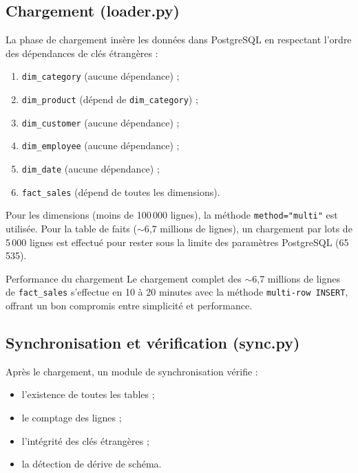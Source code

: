 \documentclass[12pt,a4paper,twoside]{report}
\begin{document}
\subsection{Chargement (loader.py)}

La phase de chargement insère les données dans PostgreSQL en respectant l'ordre des dépendances de clés étrangères :

\begin{enumerate}
  \item \texttt{dim\_category} (aucune dépendance) ;
  \item \texttt{dim\_product} (dépend de \texttt{dim\_category}) ;
  \item \texttt{dim\_customer} (aucune dépendance) ;
  \item \texttt{dim\_employee} (aucune dépendance) ;
  \item \texttt{dim\_date} (aucune dépendance) ;
  \item \texttt{fact\_sales} (dépend de toutes les dimensions).
\end{enumerate}

Pour les dimensions (moins de 100\,000 lignes), la méthode \texttt{method="multi"} est utilisée. Pour la table de faits ($\sim$6,7 millions de lignes), un chargement par lots de 5\,000 lignes est effectué pour rester sous la limite des paramètres PostgreSQL (65\,535).

\begin{resultbox}{Performance du chargement}
Le chargement complet des $\sim$6,7 millions de lignes de \texttt{fact\_sales} s'effectue en 10 à 20 minutes avec la méthode \texttt{multi-row INSERT}, offrant un bon compromis entre simplicité et performance.
\end{resultbox}

\subsection{Synchronisation et vérification (sync.py)}

Après le chargement, un module de synchronisation vérifie :
\begin{itemize}
  \item l'existence de toutes les tables ;
  \item le comptage des lignes ;
  \item l'intégrité des clés étrangères ;
  \item la détection de dérive de schéma.
\end{itemize}
\end{document}
